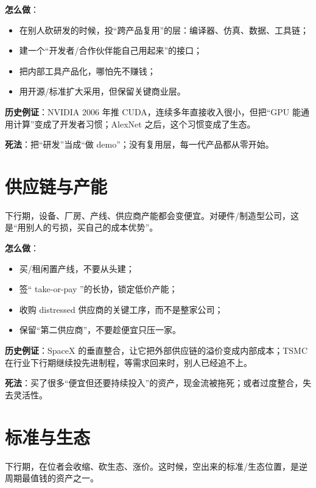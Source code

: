 \textbf{怎么做}：

\begin{itemize}
\tightlist
\item
  在别人砍研发的时候，投``跨产品复用''的层：编译器、仿真、数据、工具链；
\item
  建一个``开发者/合作伙伴能自己用起来''的接口；
\item
  把内部工具产品化，哪怕先不赚钱；
\item
  用开源/标准扩大采用，但保留关键商业层。
\end{itemize}

\textbf{历史例证}：NVIDIA 2006 年推
CUDA，连续多年直接收入很小，但把``GPU
能通用计算''变成了开发者习惯；AlexNet 之后，这个习惯变成了生态。

\textbf{死法}：把``研发''当成``做
demo''；没有复用层，每一代产品都从零开始。

\section{供应链与产能}\label{ux4f9bux5e94ux94feux4e0eux4ea7ux80fd}

下行期，设备、厂房、产线、供应商产能都会变便宜。对硬件/制造型公司，这是``用别人的亏损，买自己的成本优势''。

\textbf{怎么做}：

\begin{itemize}
\tightlist
\item
  买/租闲置产线，不要从头建；
\item
  签`` take-or-pay ''的长协，锁定低价产能；
\item
  收购 distressed 供应商的关键工序，而不是整家公司；
\item
  保留``第二供应商''，不要趁便宜只压一家。
\end{itemize}

\textbf{历史例证}：SpaceX
的垂直整合，让它把外部供应链的溢价变成内部成本；TSMC
在行业下行期继续投先进制程，等需求回来时，别人已经追不上。

\textbf{死法}：买了很多``便宜但还要持续投入''的资产，现金流被拖死；或者过度整合，失去灵活性。

\section{标准与生态}\label{ux6807ux51c6ux4e0eux751fux6001}

下行期，在位者会收缩、砍生态、涨价。这时候，空出来的标准/生态位置，是逆周期最值钱的资产之一。

